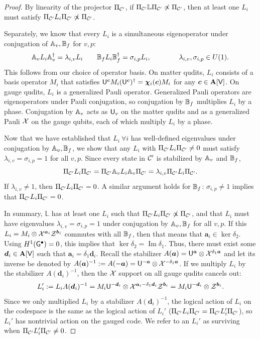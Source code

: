 \documentclass[11pt]{article}
\begin{document}
\begin{proof}
    By linearity of the projector $\Pi_{\mathcal{C}'}$, if $\Pi_{\mathcal{C}'}\mathbb{L}\Pi_{\mathcal{C}'}\not \propto \Pi_{\mathcal{C}'}$,
    then at least one $L_i$ must satisfy $\Pi_{\mathcal{C}'}L_i\Pi_{\mathcal{C}'}\not \propto \Pi_{\mathcal{C}'}$.

    Separately, we know that every $L_i$ is a simultaneous eigenoperator under conjugation of $\mathbb{A}_v, \mathbb{B}_f$ for $v,p$:
    \[
    \mathbb{A}_v L_i \mathbb{A}_v^\dagger = \lambda_{i,v}L_i\qquad \mathbb{B}_f L_i \mathbb{B}_f^\dagger = \sigma_{i,p}L_i,\qquad\qquad \lambda_{i,v}, \sigma_{i,p}\in U(1).
    \]
    This follows from our choice of operator basis. On matter qudits, $L_i$ consists of a basis operator $M_i$ that satisfies $\mathsf{U}^{\bm c} M_i (\mathsf{U}^{\bm c})^\dagger = \bm{\chi}_i(\bm c) M_i$ for any $\bm c\in \mathbf{A}[\mathsf{V}]$. 
    On gauge qudits, $L_i$ is a generalized Pauli operator. Generalized Pauli operators are eigenoperators under Pauli conjugation, so conjugation by $\mathbb{B}_f$ multiplies $L_i$ by a phase. 
    Conjugation by
    $\mathbb{A}_v$ acts as $\mathsf{U}_v$ on the matter qudits and as a generalized Pauli $\mathcal{X}$ on the gauge qubits, each of which multiply $L_i$ by a phase.
        
    Now that we have established that $L_i\ \forall i$ has well-defined eigenvalues under conjugation by $\mathbb{A}_v,\mathbb{B}_f$, we show that any $L_i$ with $\Pi_{\mathcal{C}'}L_i\Pi_{\mathcal{C}'}\neq 0$ must satisfy $\lambda_{i,v}=\sigma_{i,p}=1$ for all $v,p$. Since every state in $\mathcal{C}'$ is stabilized by $\mathbb{A}_v$ and $\mathbb{B}_f$, 
    \[
    \Pi_{\mathcal{C}'}L_i\Pi_{\mathcal{C}'} = \Pi_{\mathcal{C}'}\mathbb{A}_v L_i\mathbb{A}_v \Pi_{\mathcal{C}'}  = \lambda_{i,v}\Pi_{\mathcal{C}'}L_i\Pi_{\mathcal{C}'} .
    \]
    If $\lambda_{i,v}\neq 1$, then $\Pi_{\mathcal{C}'}L_i\Pi_{\mathcal{C}'} =0$. A similar argument holds for $\mathbb{B}_f$: $\sigma_{i,p}\neq 1$ implies that $\Pi_{\mathcal{C}'}L_i\Pi_{\mathcal{C}'} =0$.
    
    In summary, $\mathbb{L}$ has at least one $L_i$ such that $\Pi_{\mathcal{C}'}L_i\Pi_{\mathcal{C}'}\not \propto \Pi_{\mathcal{C}'}$, and that $L_i$ must have eigenvalues $\lambda_{i,v}=\sigma_{i,p}=1$ under conjugation by $\mathbb{A}_v,\mathbb{B}_f$ for all $v,p$.
    If this $L_i=M_i\otimes\mathcal{X}^{\bm a_i}\mathcal{Z}^{\bm b_i}$ commutes with all $\mathbb{B}_f$, then that means that $\bm a_i\in \ker\delta_2$. Using $H^1(\mathsf{G}^\bullet)=0$, this implies that $\ker\delta_2 = \mathop{Im}\delta_1$. Thus, there must exist some $\bm d_i\in \mathbf{A}[\mathsf{V}]$ such that $\bm a_i=\delta_1 \bm d_i$.
    Recall the stabilizer $A(\bm a) = \mathsf{U}^{\bm{a}}\otimes \mathcal{X}^{\delta_1\bm a}$ and let its inverse be denoted by $A(\bm a)^{-1} := A(-\bm a) = \mathsf{U}^{-\bm a}\otimes \mathcal{X}^{-\delta_1\bm a}$.
    If we multiply $L_i$ by the stabilizer $A(\bm d_i)^{-1}$, then the $\mathcal{X}$ support on all gauge qudits cancels out:
    \[
    L_i':=L_iA(\bm d_i)^{-1} = M_i\mathsf{U}^{-\bm d_i}\otimes \mathcal{X}^{\bm a_i-\delta_1 \bm d_i}\mathcal{Z}^{\bm b_i} = M_i\mathsf{U}^{-\bm d_i}\otimes \mathcal{Z}^{\bm b_i}.
    \]
    Since we only multiplied $L_i$ by a stabilizer $A(\bm d_i)^{-1}$, the logical action of $L_i$ on the codespace is the same as the logical action of $L_i'$ ($\Pi_{\mathcal{C}'}L_i \Pi_{\mathcal{C}'} =  \Pi_{\mathcal{C}'}L_i' \Pi_{\mathcal{C}'}$), so $L_i'$ has nontrivial action on the gauged code.
    We refer to an $L_i'$ as surviving when $\Pi_{\mathcal{C}'}L_i' \Pi_{\mathcal{C}'}\neq 0$.
    

\end{proof}
\end{document}
